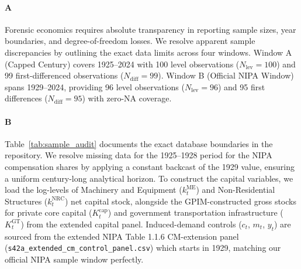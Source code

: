 \documentclass[11pt,a4paper]{article}
\begin{document}
\paragraph{A}
Forensic economics requires absolute transparency in reporting sample sizes, year boundaries, and degree-of-freedom losses. We resolve apparent sample discrepancies by outlining the exact data limits across four windows. Window A (Capped Century) covers 1925--2024 with 100 level observations ($N_{\text{lev}} = 100$) and 99 first-differenced observations ($N_{\text{diff}} = 99$). Window B (Official NIPA Window) spans 1929--2024, providing 96 level observations ($N_{\text{lev}} = 96$) and 95 first differences ($N_{\text{diff}} = 95$) with zero-NA coverage.

\paragraph{B}
Table~\ref{tab:sample_audit} documents the exact database boundaries in the repository. We resolve missing data for the 1925--1928 period for the NIPA compensation shares by applying a constant backcast of the 1929 value, ensuring a uniform century-long analytical horizon. To construct the capital variables, we load the log-levels of Machinery and Equipment ($k^{\text{ME}}_t$) and Non-Residential Structures ($k^{\text{NRC}}_t$) net capital stock, alongside the GPIM-constructed gross stocks for private core capital ($K^{\text{cap}}_t$) and government transportation infrastructure ($K^{\text{GT}}_t$) from the extended capital panel. Induced-demand controls ($c_t$, $m_t$, $y_t$) are sourced from the extended NIPA Table 1.1.6 CM-extension panel (\texttt{s42a\_extended\_cm\_control\_panel.csv}) which starts in 1929, matching our official NIPA sample window perfectly.
\end{document}

